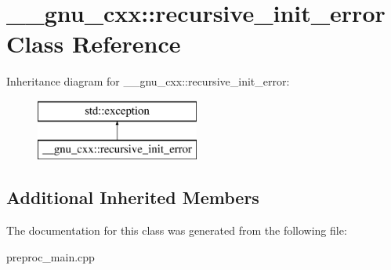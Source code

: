 \hypertarget{class____gnu__cxx_1_1recursive__init__error}{\section{\+\_\+\+\_\+gnu\+\_\+cxx\+:\+:recursive\+\_\+init\+\_\+error Class Reference}
\label{class____gnu__cxx_1_1recursive__init__error}
}
Inheritance diagram for \+\_\+\+\_\+gnu\+\_\+cxx\+:\+:recursive\+\_\+init\+\_\+error\+:\begin{figure}[H]
\begin{center}
\leavevmode
\includegraphics[height=2.000000cm]{class____gnu__cxx_1_1recursive__init__error}
\end{center}
\end{figure}
\subsection*{Additional Inherited Members}


The documentation for this class was generated from the following file\+:\begin{DoxyCompactItemize}
\item 
preproc\+\_\+main.\+cpp\end{DoxyCompactItemize}
